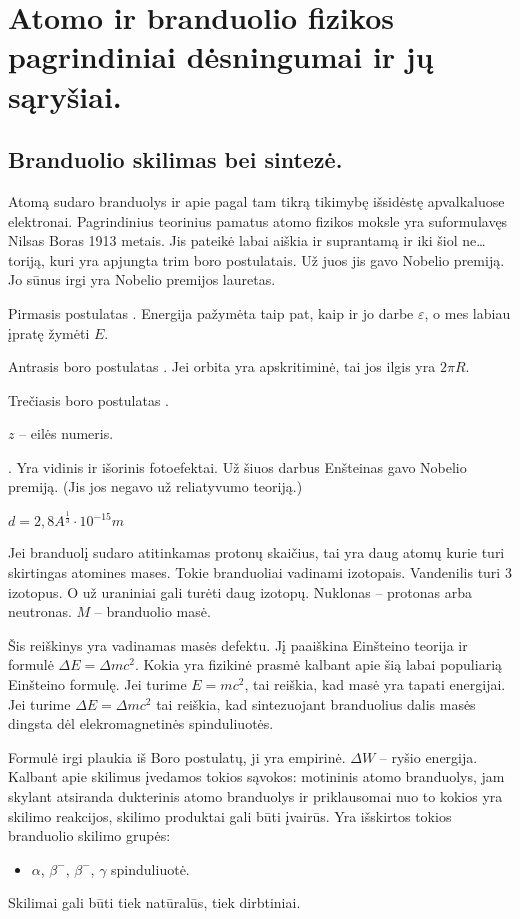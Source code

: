 \chapter{Atomo ir branduolio fizikos pagrindiniai dėsningumai ir jų
sąryšiai.}
\section{Branduolio skilimas bei sintezė.}

Atomą sudaro branduolys ir apie pagal tam tikrą tikimybę išsidėstę
apvalkaluose elektronai. Pagrindinius teorinius pamatus atomo
fizikos moksle yra suformulavęs Nilsas Boras 1913 metais. Jis
pateikė labai aiškia ir suprantamą ir iki šiol ne… toriją, kuri
yra apjungta trim boro postulatais. Už juos jis gavo Nobelio premiją.
Jo sūnus irgi yra Nobelio premijos lauretas.

Pirmasis postulatas . Energija pažymėta taip pat, kaip ir
jo darbe $\varepsilon$, o mes labiau įpratę žymėti $E$.

Antrasis boro postulatas . Jei orbita yra apskritiminė,
tai jos ilgis yra $2 \pi R $.

Trečiasis boro postulatas .

 $z$ – eilės numeris.

.
Yra vidinis ir išorinis fotoefektai. Už šiuos darbus Enšteinas gavo
Nobelio premiją. (Jis jos negavo už reliatyvumo teoriją.)

 $d = 2,8 A^{\frac{1}{3}} \cdot 10 ^{-15}m$

Jei branduolį sudaro atitinkamas protonų skaičius, tai yra daug
atomų kurie turi skirtingas atomines mases. Tokie branduoliai vadinami
izotopais. Vandenilis turi 3 izotopus. O už uraniniai gali turėti
daug izotopų.
Nuklonas – protonas arba neutronas. $M$ – branduolio masė.

 Šis reiškinys yra vadinamas masės defektu. Jį paaiškina
Einšteino teorija ir formulė $\Delta E = \Delta m c^{2}$. Kokia
yra fizikinė prasmė kalbant apie šią labai populiarią Einšteino
formulę. Jei turime $E = mc^{2}$, tai reiškia, kad masė yra tapati
energijai. Jei turime $\Delta E = \Delta mc^{2}$ tai reiškia, kad
sintezuojant branduolius dalis masės dingsta dėl elekromagnetinės
spinduliuotės. 

 Formulė irgi plaukia iš Boro postulatų, ji yra empirinė.
$\Delta W$ – ryšio energija. Kalbant apie skilimus įvedamos
tokios sąvokos: motininis atomo branduolys, jam skylant atsiranda
dukterinis atomo branduolys ir priklausomai nuo to kokios yra skilimo
reakcijos, skilimo produktai gali būti įvairūs. Yra išskirtos
tokios branduolio skilimo grupės:
\begin{itemize}
  \item $\alpha$, $\beta^{-}$, $\beta^{-}$, $\gamma$ spinduliuotė.
\end{itemize}
Skilimai gali būti tiek natūralūs, tiek dirbtiniai.

